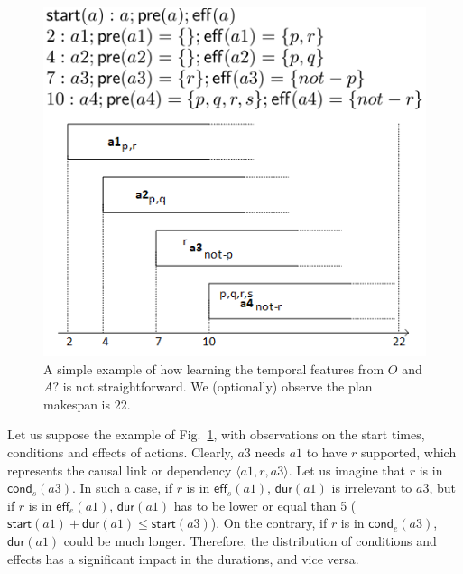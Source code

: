 \documentclass[10pt,journal,compsoc]{IEEEtran}
\newcommand{\tup}[1]{{\langle #1 \rangle}}
\newcommand{\pre}{\mathsf{pre}}    %
\newcommand{\eff}{\mathsf{eff}}    %
\newcommand{\cond}{\mathsf{cond}}  %
\newcommand{\dur}{\mathsf{dur}}    %
\newcommand{\start}{\mathsf{start}}%
\begin{document}
\begin{figure}
	\center \includegraphics[width=0.75\linewidth]{ejemploacciones3.png}
	\caption{A simple example of how learning the temporal features from $O$ and $A?$ is not straightforward. We (optionally) observe the plan makespan is 22.}
	\label{fig:exampleplantrace}
\end{figure}

Let us suppose the example of Fig.~\ref{fig:exampleplantrace}, with observations on the start times, conditions and effects of actions. Clearly, $a3$ needs $a1$ to have $r$ supported, which represents the causal link or dependency $\tup{a1,r,a3}$. Let us imagine that $r$ is in $\cond_s(a3)$. In such a case, if $r$ is in $\eff_s(a1)$, $\dur(a1)$ is irrelevant to $a3$, but if $r$ is in $\eff_e(a1)$, $\dur(a1)$ has to be lower or equal than 5 ($\start(a1)+\dur(a1) \leq \start(a3)$). On the contrary, if $r$ is in $\cond_e(a3)$, $\dur(a1)$ could be much longer. Therefore, the distribution of conditions and effects has a significant impact in the durations, and vice versa.
\end{document}
